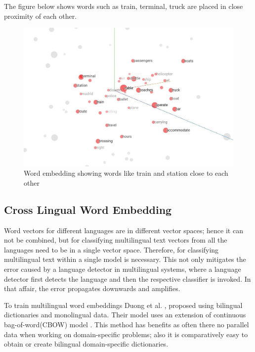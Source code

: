 The figure below shows words such as train, terminal, truck are placed in close proximity of each other.

\begin{figure}[!ht]
    \centering
    \includegraphics[width=13cm]{pics/Word2Vec.jpg}
     \captionsetup{justification=centering,margin=2cm}
    \caption{Word embedding showing words like train and station close to each other}
    \label{fig:Word2Vec}
\end{figure}


\subsection{Cross Lingual Word Embedding}\label{backgroundCrosslingual}

Word vectors for different languages are in different vector spaces; hence it can not be combined, but for classifying multilingual text vectors from all the languages need to be in a single vector space. Therefore, for classifying multilingual text within a single model is necessary. This not only mitigates the error caused by a language detector in multilingual systems, where a language detector first detects the language and then the respective classifier is invoked. In that affair, the error propagates downwards and amplifies.  

To train multilingual word embeddings Duong et al. \cite{duong-EtAl:2016:EMNLP}, proposed using bilingual dictionaries and monolingual data. Their model uses an extension of continuous bag-of-word(CBOW) model \cite{mikolov2013efficient}. This method has benefits as often there no parallel data when working on domain-specific problems; also it is comparatively easy to obtain or create bilingual domain-specific dictionaries.

